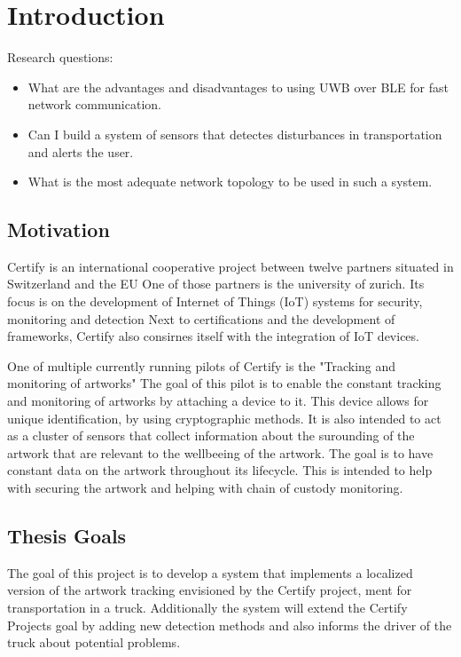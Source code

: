 \chapter{Introduction}

Research questions:
\begin{itemize}
  \item What are the advantages and disadvantages to using UWB over BLE for fast network communication.
  \item Can I build a system of sensors that detectes disturbances in transportation and alerts the user.
  \item What is the most adequate network topology to be used in such a system.
\end{itemize}

\section{Motivation}

Certify is an international cooperative project between twelve partners situated in Switzerland and the EU %
One of those partners is the university of zurich.
Its focus is on the development of Internet of Things (IoT) systems for security, monitoring and detection %
Next to certifications and the development of frameworks, Certify also consirnes itself with the integration of IoT devices.


One of multiple currently running pilots of Certify is the "Tracking and monitoring of artworks" %
The goal of this pilot is to enable the constant tracking and monitoring of artworks by attaching a device to it.
This device allows for unique identification, by using cryptographic methods.
It is also intended to act as a cluster of sensors that collect information about the surounding of the artwork that are relevant to the wellbeeing of the artwork.
The goal is to have constant data on the artwork throughout its lifecycle.
This is intended to help with securing the artwork and helping with chain of custody monitoring.



\section{Thesis Goals}

The goal of this project is to develop a system that implements a localized version of the artwork tracking envisioned by the Certify project, ment for transportation in a truck.
Additionally the system will extend the Certify Projects goal by adding new detection methods and also informs the driver of the truck about potential problems.

